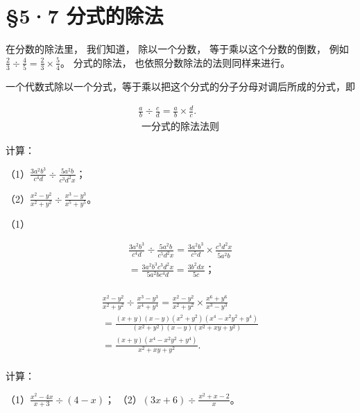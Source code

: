 \section{§5·7 分式的除法}

在分数的除法里， 我们知道， 除以一个分数， 等于乘以这个分数的倒数，
例如\(\frac{2}{3} \div \frac{4}{5} = \frac{2}{3} \times \frac{5}{4}\)。
分式的除法， 也依照分数除法的法则同样来进行。

一个代数式除以一个分式，等于乘以把这个分式的分子分母对调后所成的分式，即

\[
\boxed { \begin{array}{c} \frac{a}{b} \div \frac{c}{d} = \frac{a}{b} \times \frac{d}{c}. \\ \text{ 一分式的除法法则 } \end{array} }
\]

 计算：

（1）\(\frac{3a^2b^3}{c^4d} \div \frac{5a^2b}{c^3d^2x}\)；

（2）\(\frac{x^2 - y^2}{x^2 + y^2} \div \frac{x^3 - y^3}{x^5 + y^5}\)。


（1）

\[
\begin{array}{l} \frac{3 a ^{2} b ^{3}}{c ^{4} d} \div \frac{5 a ^{2} b}{c ^{5} d ^{2} x} = \frac{3 a ^{2} b ^{3}}{c ^{5} d} \times \frac{c ^{3} d ^{2} x}{\overline {{{5}}} a ^{2} b} \\ = \frac{3 a ^{2} b ^{3} c ^{3} d ^{2} x}{5 a ^{2} b c ^{4} d} = \frac{3 b ^{2} d x}{5 c}\text{；} \\ \end{array}
\]

\[
\begin{array}{l} \frac{x ^{2} - y ^{2}}{x ^{2} + y ^{2}} \div \frac{x ^{3} - y ^{3}}{x ^{4} + y ^{4}} = \frac{x ^{2} - y ^{2}}{x ^{2} + y ^{2}} \times \frac{x ^{6} + y ^{6}}{x ^{3} - y ^{3}} \\ = \frac{(x + y) (x - y) (x ^{2} + y ^{2}) (x ^{4} - x ^{2} y ^{2} + y ^{4})}{(x ^{2} + y ^{2}) (x - y) (x ^{2} + x y + y ^{2})} \\ = \frac{(x + y) (x ^{4} - x ^{2} y ^{2} + y ^{4})}{x ^{2} + x y + y ^{2}}. \\ \end{array}
\]

 计算：

（1）\(\frac{x^2 - 4x}{x + 3} \div (4 - x)\)；
（2）\((3x + 6) \div \frac{x^2 + x - 2}{x}\)。

